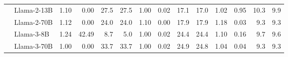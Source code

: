 \begin{table}[t]
{\begin{tabular}{l|l|rrrr|rrrr|rrrr}
                           & Llama-2-13B        & 1.10                    & 0.00                    & 27.5                    & 27.5                   & 1.00                    & 0.02                    & 17.1                    & 17.0                   & 1.02                    & 0.95                    & 10.3                    & 9.9                   \\
                           & Llama-2-70B        & 1.12                    & 0.00                    & 24.0                    & 24.0                   & 1.10                    & 0.00                    & 17.9                    & 17.9                   & 1.18                    & 0.03                    & 9.3                     & 9.3                   \\
                           & Llama-3-8B         & 1.24                    & 42.49                   & 8.7                     & 5.0                    & 1.00                    & 0.02                    & 24.4                    & 24.4                   & 1.10                    & 0.16                    & 9.7                     & 9.6                   \\
                           & Llama-3-70B        & 1.00                    & 0.00                    & 33.7                    & 33.7                   & 1.00                    & 0.02                    & 24.9                    & 24.8                   & 1.04                    & 0.04                    & 9.3                     & 9.3                   \\

\end{tabular}}
\end{table}
